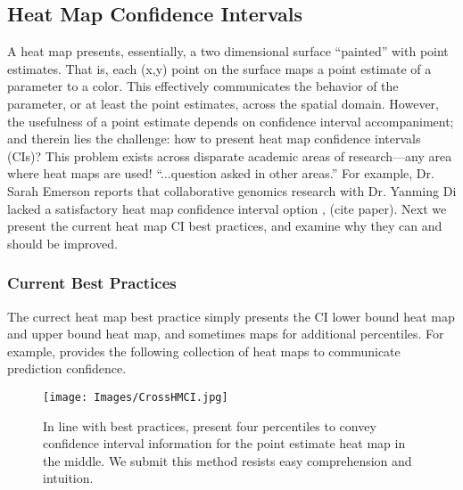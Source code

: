\documentclass{article}
\begin{document}
\subsection{Heat Map Confidence Intervals}

A heat map presents, essentially, a two dimensional surface ``painted'' with point estimates. That is, each (x,y) point on the surface maps a point estimate of a parameter to a color. This effectively communicates the behavior of the parameter, or at least the point estimates, across the spatial domain. However, the usefulness of a point estimate depends on confidence interval accompaniment; and therein lies the challenge: how to present heat map confidence intervals (CIs)? This problem exists across disparate academic areas of research---any area where heat maps are used! ``...question asked in other areas.'' For example, Dr. Sarah Emerson reports that collaborative genomics research with Dr. Yanming Di lacked a satisfactory heat map confidence interval option \citep{Emerson}, (cite paper). Next we present the current heat map CI best practices, and examine why they can and should be improved.

\subsubsection{Current Best Practices}

The currect heat map best practice simply presents the CI lower bound heat map and upper bound heat map, and sometimes maps for additional percentiles. For example, \cite{Cross2015} provides the following collection of heat maps to communicate prediction confidence.

  \begin{figure}[H]
	\texttt{[image: Images/CrossHMCI.jpg]} 
	\caption{In line with best practices, \cite{Cross2015} present four percentiles to convey confidence interval information for the point estimate heat map in the middle. We submit this method resists easy comprehension and intuition.}
	\end{figure} 
	
\end{document}
